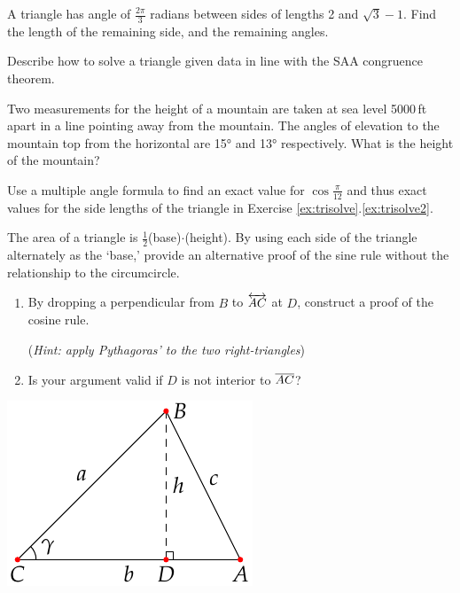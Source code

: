 \begin{exercises}{}{}
\exstart A triangle has angle of $\frac{2\pi}3$ radians between sides of lengths 2 and $\sqrt 3-1$. Find the length of the remaining side, and the remaining angles.\vspace{-2pt}
\begin{enumerate}\setcounter{enumi}{1}	
	\item Describe how to solve a triangle given data in line with the SAA congruence theorem.
	
	
	\item Two measurements for the height of a mountain are taken at sea level 5000\,ft apart in a line pointing away from the mountain. The angles of elevation to the mountain top from the horizontal are \ang{15} and \ang{13} respectively. What is the height of the mountain?
	
	
	\item Use a multiple angle formula to find an exact value for $\cos\frac{\pi}{12}$ and thus exact values for the side lengths of the triangle in Exercise \ref*{ex:trisolve}.\ref{ex:trisolve2}.
	
	
	\item The area of a triangle is $\frac 12$(base)$\cdot$(height). By using each side of the triangle alternately as the `base,' provide an alternative proof of the sine rule without the relationship to the circumcircle. 

\begin{minipage}[t]{0.72\linewidth}\vspace{-8pt}	
	\item\begin{enumerate}
	  \item By dropping a perpendicular from $B$ to $\overleftrightarrow{AC}$ at $D$, construct a proof of the cosine rule.\par
 		(\emph{Hint: apply Pythagoras' to the two right-triangles})
 		
 		\item Is your argument valid if $D$ is not interior to $\overline{AC}$?
	\end{enumerate}
\end{minipage}\hfill\begin{minipage}[t]{0.27\linewidth}\vspace{-12pt}
\flushright\includegraphics[scale=0.9]{angles-cosrule}
\end{minipage}


\end{enumerate}
\end{exercises}
